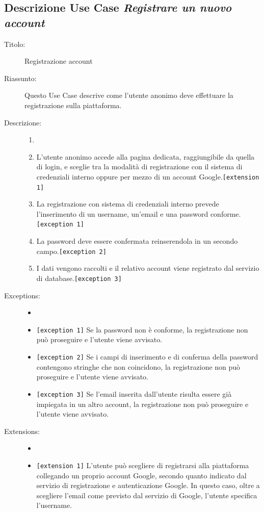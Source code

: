 \documentclass[11pt, a4paper]{article}
\theoremstyle{definition} %
\begin{document}
\subsection*{Descrizione Use Case \textit{Registrare un nuovo account}}
\begin{description}
    \item[Titolo:] Registrazione account
    
    \item[Riassunto:] Questo Use Case descrive come l'utente anonimo deve
    effettuare la registrazione sulla piattaforma.

    \item[Descrizione:]
    \begin{enumerate}
        \item[]
        \item L'utente anonimo accede alla pagina dedicata, raggiungibile da quella di login, e sceglie tra la modalità di registrazione con il sistema di credenziali interno oppure per mezzo di un account Google.\texttt{[extension 1]}
        \item La registrazione con sistema di credenziali interno prevede l'inserimento di un username, un'email e una password conforme. \verb|[exception 1]|
        \item La password deve essere confermata reinserendola in un secondo campo.\verb|[exception 2]|
        \item I dati vengono raccolti e il relativo account viene registrato dal servizio di database.\texttt{[exception 3]}
    \end{enumerate}
    
    \item[Exceptions:]
    \begin{itemize}
        \item[]
        \item \texttt{[exception 1]} Se la password non è conforme, la registrazione non può proseguire e l'utente viene avvisato.
        \item \texttt{[exception 2]} Se i campi di inserimento e di conferma della password contengono stringhe che non coincidono, la registrazione non può proseguire e l'utente viene avvisato.
        \item \texttt{[exception 3]} Se l'email inserita dall'utente risulta essere già impiegata in un altro account, la registrazione non può proseguire e l'utente viene avvisato.
    \end{itemize}

    \item[Extensions:]
    \begin{itemize}
        \item[]
        \item \texttt{[extension 1]} L'utente può scegliere di registrarsi alla piattaforma collegando un proprio account Google, secondo quanto indicato dal servizio di registrazione e autenticazione Google.
        In questo caso, oltre a scegliere l'email come previsto dal servizio di Google, l'utente specifica l'username.
    \end{itemize}
\end{description}
\end{document}

